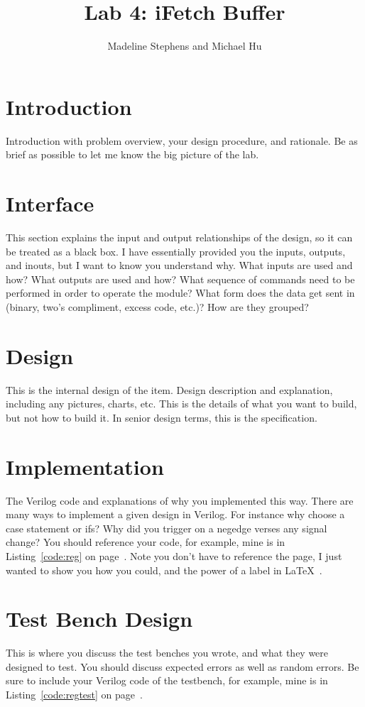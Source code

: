 \documentclass{article}
\author{Madeline Stephens and Michael Hu}
\title{Lab 4: iFetch Buffer}
\newcommand{\Verilog}[3]{
  \lstset{language=Verilog}
  \lstset{backgroundcolor=\color{listinggray},rulecolor=\color{blue}}
  \lstset{linewidth=\textwidth}
  \lstset{commentstyle=\textit, stringstyle=\upshape,showspaces=false}
  \lstset{frame=tb}
  
}
\begin{document}
\maketitle

\section{Introduction}


Introduction with problem overview, your design procedure, and rationale.  Be as brief as possible to let me know the big picture of the lab.

\section{Interface}
This section explains the input and output relationships of the design, so it can be treated as a black box.  I have essentially provided you the inputs, outputs, and inouts, but I want to know you understand why.  What inputs are used and how?  What outputs are used and how?  What sequence of commands need to be performed in order to operate the module?  What form does the data get sent in (binary, two's compliment, excess code, etc.)?  How are they grouped?

\section{Design}
This is the internal design of the item.  Design description and explanation, including any pictures, charts, etc.  This is the details of what you want to build, but not how to build it.  In senior design terms, this is the specification.

\section{Implementation}
The Verilog code and explanations of why you implemented this way.  There are many ways to implement a given design in Verilog.  For instance why choose a case statement or ifs?  Why did you trigger on a negedge verses any signal change?  You should reference your code, for example, mine is in Listing~\ref{code:reg} on page~\pageref{code:reg}.  Note you don't have to reference the page, I just wanted to show you how you could, and the power of a label in \LaTeX\ .

\Verilog{Verilog code for implementing a register.}{code:reg}{../code/register.v}

\section{Test Bench Design}
This is where you discuss the test benches you wrote, and what they were designed to test.  You should discuss expected errors as well as random errors.  Be sure to include your Verilog code of the testbench, for example, mine is in Listing~\ref{code:regtest} on page~\pageref{code:regtest}.
\end{document}
